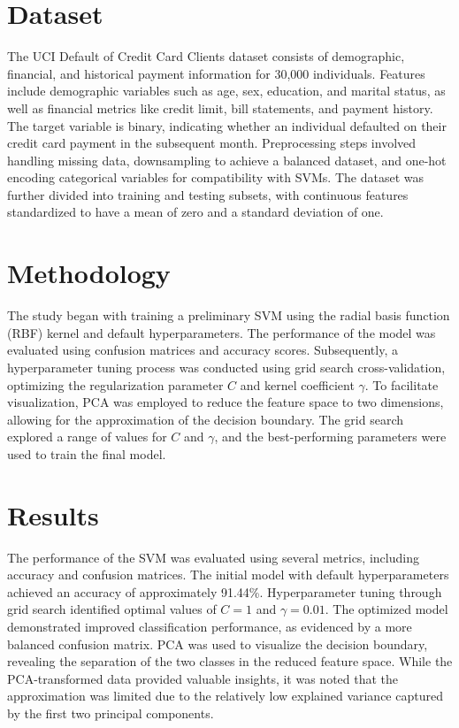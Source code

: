 \documentclass{article}  %
\begin{document}
\section{Dataset}
The UCI Default of Credit Card Clients dataset consists of demographic, financial, and historical payment information for 30,000 individuals. Features include demographic variables such as age, sex, education, and marital status, as well as financial metrics like credit limit, bill statements, and payment history. The target variable is binary, indicating whether an individual defaulted on their credit card payment in the subsequent month. Preprocessing steps involved handling missing data, downsampling to achieve a balanced dataset, and one-hot encoding categorical variables for compatibility with SVMs. The dataset was further divided into training and testing subsets, with continuous features standardized to have a mean of zero and a standard deviation of one.

\section{Methodology}
The study began with training a preliminary SVM using the radial basis function (RBF) kernel and default hyperparameters. The performance of the model was evaluated using confusion matrices and accuracy scores. Subsequently, a hyperparameter tuning process was conducted using grid search cross-validation, optimizing the regularization parameter \( C \) and kernel coefficient \( \gamma \). To facilitate visualization, PCA was employed to reduce the feature space to two dimensions, allowing for the approximation of the decision boundary. The grid search explored a range of values for \( C \) and \( \gamma \), and the best-performing parameters were used to train the final model.

\section{Results}
The performance of the SVM was evaluated using several metrics, including accuracy and confusion matrices. The initial model with default hyperparameters achieved an accuracy of approximately 91.44\%. Hyperparameter tuning through grid search identified optimal values of \( C = 1 \) and \( \gamma = 0.01 \). The optimized model demonstrated improved classification performance, as evidenced by a more balanced confusion matrix. PCA was used to visualize the decision boundary, revealing the separation of the two classes in the reduced feature space. While the PCA-transformed data provided valuable insights, it was noted that the approximation was limited due to the relatively low explained variance captured by the first two principal components.
\end{document}
